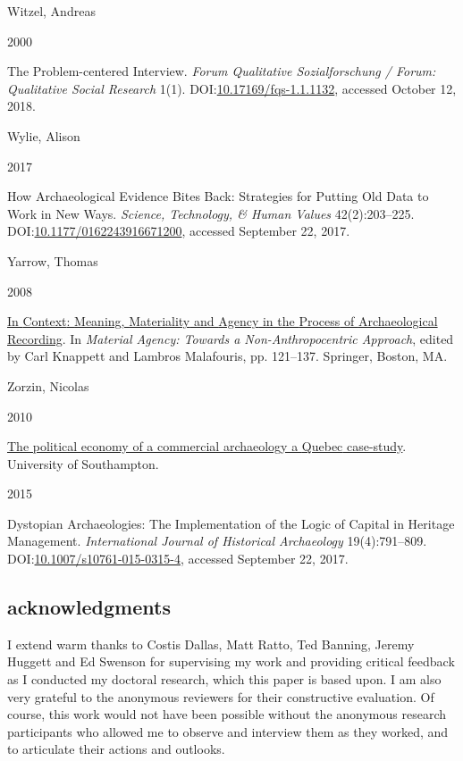 \documentclass[
]{article}
\newlength{\cslhangindent}
\newlength{\csllabelwidth}
\newenvironment{CSLReferences}[2] %
 {\begin{list}{}{%
  \setlength{\itemindent}{0pt}
  \setlength{\leftmargin}{0pt}
  \setlength{\parsep}{0pt}
  \ifodd #1
   \setlength{\leftmargin}{\cslhangindent}
   \setlength{\itemindent}{-1\cslhangindent}
  \fi
  \setlength{\itemsep}{#2\baselineskip}}}
 {\end{list}}
\newcommand{\CSLBlock}[1]{\hfill\break\parbox[t]{\linewidth}{\strut\ignorespaces#1\strut}}
\newcommand{\CSLLeftMargin}[1]{\parbox[t]{\csllabelwidth}{\strut#1\strut}}
\newcommand{\CSLRightInline}[1]{\parbox[t]{\linewidth - \csllabelwidth}{\strut#1\strut}}
\begin{document}
\begin{CSLReferences}{0}{1}
\CSLBlock{Witzel, Andreas}
\CSLLeftMargin{ 2000}%
\CSLRightInline{The Problem-centered Interview. \emph{Forum Qualitative
Sozialforschung / Forum: Qualitative Social Research} 1(1).
DOI:\href{https://doi.org/10.17169/fqs-1.1.1132}{10.17169/fqs-1.1.1132},
accessed October 12, 2018.}

\CSLBlock{Wylie, Alison}
\CSLLeftMargin{ 2017}%
\CSLRightInline{How {Archaeological Evidence Bites Back}: {Strategies}
for {Putting Old Data} to {Work} in {New Ways}. \emph{Science,
Technology, \& Human Values} 42(2):203--225.
DOI:\href{https://doi.org/10.1177/0162243916671200}{10.1177/0162243916671200},
accessed September 22, 2017.}

\CSLBlock{Yarrow, Thomas}
\CSLLeftMargin{ 2008}%
\CSLRightInline{\href{https://doi.org/10.1007/978-0-387-74711-8_7}{In
{Context}: {Meaning}, {Materiality} and {Agency} in the {Process} of
{Archaeological Recording}}. In \emph{Material {Agency}: {Towards} a
{Non-Anthropocentric Approach}}, edited by Carl Knappett and Lambros
Malafouris, pp. 121--137. Springer, Boston, MA.}

\CSLBlock{Zorzin, Nicolas}
\CSLLeftMargin{ 2010}%
\CSLRightInline{\href{https://eprints.soton.ac.uk/344777/}{The political
economy of a commercial archaeology a {Quebec} case-study}. University
of Southampton.}

\CSLLeftMargin{ 2015 }%
\CSLRightInline{Dystopian {Archaeologies}: {The Implementation} of the
{Logic} of {Capital} in {Heritage Management}. \emph{International
Journal of Historical Archaeology} 19(4):791--809.
DOI:\href{https://doi.org/10.1007/s10761-015-0315-4}{10.1007/s10761-015-0315-4},
accessed September 22, 2017.}

\end{CSLReferences}

\subsection{acknowledgments}\label{acknowledgments}

I extend warm thanks to Costis Dallas, Matt Ratto, Ted Banning, Jeremy
Huggett and Ed Swenson for supervising my work and providing critical
feedback as I conducted my doctoral research, which this paper is based
upon. I am also very grateful to the anonymous reviewers for their
constructive evaluation. Of course, this work would not have been
possible without the anonymous research participants who allowed me to
observe and interview them as they worked, and to articulate their
actions and outlooks.
\end{document}
